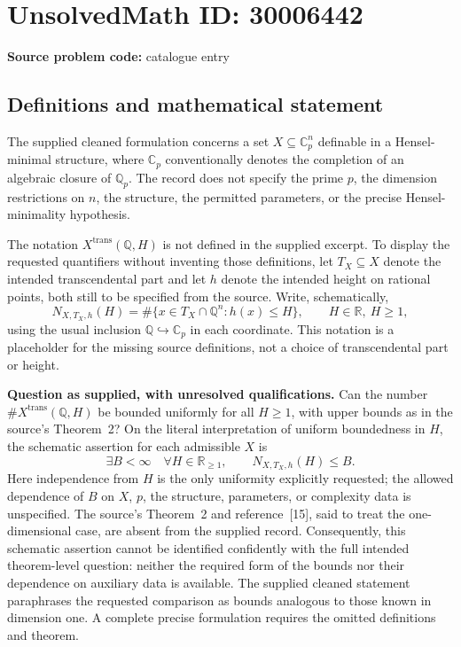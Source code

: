 \documentclass[11pt]{article}
\begin{document}
\section*{UnsolvedMath ID: 30006442}
\textbf{Source problem code:} catalogue entry
\subsection{Definitions and mathematical statement}
The supplied cleaned formulation concerns a set \(X\subseteq\mathbb{C}_p^n\) definable in a Hensel-minimal structure, where \(\mathbb{C}_p\) conventionally denotes the completion of an algebraic closure of \(\mathbb{Q}_p\). The record does not specify the prime \(p\), the dimension restrictions on \(n\), the structure, the permitted parameters, or the precise Hensel-minimality hypothesis.

The notation \(X^{\mathrm{trans}}(\mathbb{Q},H)\) is not defined in the supplied excerpt. To display the requested quantifiers without inventing those definitions, let \(T_X\subseteq X\) denote the intended transcendental part and let \(h\) denote the intended height on rational points, both still to be specified from the source. Write, schematically,
\[
N_{X,T_X,h}(H)=\#\{x\in T_X\cap\mathbb{Q}^n:h(x)\leq H\},\qquad H\in\mathbb{R},\ H\geq1,
\]
using the usual inclusion \(\mathbb{Q}\hookrightarrow\mathbb{C}_p\) in each coordinate. This notation is a placeholder for the missing source definitions, not a choice of transcendental part or height.

\textbf{Question as supplied, with unresolved qualifications.} Can the number \(\#X^{\mathrm{trans}}(\mathbb{Q},H)\) be bounded uniformly for all \(H\geq1\), with upper bounds as in the source's Theorem~2? On the literal interpretation of uniform boundedness in \(H\), the schematic assertion for each admissible \(X\) is
\[
\exists B<\infty\quad\forall H\in\mathbb{R}_{\geq1},\qquad N_{X,T_X,h}(H)\leq B.
\]
Here independence from \(H\) is the only uniformity explicitly requested; the allowed dependence of \(B\) on \(X\), \(p\), the structure, parameters, or complexity data is unspecified. The source's Theorem~2 and reference~[15], said to treat the one-dimensional case, are absent from the supplied record. Consequently, this schematic assertion cannot be identified confidently with the full intended theorem-level question: neither the required form of the bounds nor their dependence on auxiliary data is available. The supplied cleaned statement paraphrases the requested comparison as bounds analogous to those known in dimension one. A complete precise formulation requires the omitted definitions and theorem.
\end{document}
